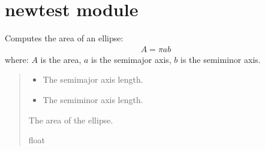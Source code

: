 \documentclass[a4paper,14pt,oneside,english,openany]{sphinxmanual}
\begin{document}
\section{newtest module}
\label{\detokenize{newtest:module-newtest}}\label{\detokenize{newtest:newtest-module}}\label{\detokenize{newtest::doc}}

\begin{fulllineitems}
\label{\detokenize{newtest:newtest.area_of_ellipse}}
\pysigstartsignatures
{}
\pysigstopsignatures
\sphinxAtStartPar
Computes the area of an ellipse:
\begin{equation*}
\begin{split}A = \pi a b\end{split}
\end{equation*}
\sphinxAtStartPar
where:
\sphinxhyphen{} \(A\) is the area,
\sphinxhyphen{} \(a\) is the semi\sphinxhyphen{}major axis,
\sphinxhyphen{} \(b\) is the semi\sphinxhyphen{}minor axis.
\begin{quote}\begin{description}
\begin{itemize}
\item {} 
\sphinxAtStartPar
{} \textendash{} The semi\sphinxhyphen{}major axis length.

\item {} 
\sphinxAtStartPar
{} \textendash{} The semi\sphinxhyphen{}minor axis length.

\end{itemize}

\sphinxAtStartPar
The area of the ellipse.

\sphinxAtStartPar
float

\end{description}\end{quote}

\end{fulllineitems}

\end{document}
